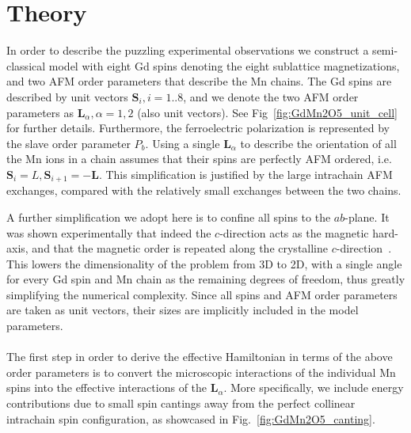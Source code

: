 \section{Theory \label{sec:GdMn2O5_Theory}}
In order to describe the puzzling experimental observations we construct a semi-classical model with eight Gd spins denoting the eight sublattice magnetizations, and two AFM order parameters that describe the Mn chains.
The Gd spins are described by unit vectors $\bm{S}_i, i=1..8$, and we denote the two AFM order parameters as $\bm{L}_\alpha, \alpha=1,2$ (also unit vectors). See Fig~\ref{fig:GdMn2O5_unit_cell} for further details.
Furthermore, the ferroelectric polarization is represented by the slave order parameter $P_b$.
Using a single $\bm{L}_\alpha$ to describe the orientation of all the Mn ions in a chain assumes that their spins are perfectly AFM ordered, i.e. $\bm{S}_i = L, \bm{S}_{i+1} = - \bm{L}$.
This simplification is justified by the large intrachain AFM exchanges, compared with the relatively small exchanges between the two chains.

A further simplification we adopt here is to confine all spins to the $ab$-plane.
It was shown experimentally that indeed the $c$-direction acts as the magnetic hard-axis, and that the magnetic order is repeated along the crystalline $c$-direction~\cite{Lee13}.
This lowers the dimensionality of the problem from 3D to 2D, with a single angle for every Gd spin and Mn chain as the remaining degrees of freedom, thus greatly simplifying the numerical complexity.
Since all spins and AFM order parameters are taken as unit vectors, their sizes are implicitly included in the model parameters.
\\\\
The first step in order to derive the effective Hamiltonian in terms of the above order parameters is to convert the microscopic interactions of the individual Mn spins into the effective interactions of the $\bm{L}_\alpha$.
More specifically, we include energy contributions due to small spin cantings away from the perfect collinear intrachain spin configuration, as showcased in Fig.~\ref{fig:GdMn2O5_canting}.

\begin{figure*}[h]
    \centering
	\caption{{\bf Energy contributions due to spin canting.} a) The Zeeman contribution due to the weak ferromagnetic moment along the field (H, red arrow), as a result of the spin canting. b) The contribution due to Heisenberg exchange when previously parallel Mn spins are canted towards a more AFM alignment. This is a direct result of the geometric frustration. The collinear configuration is denoted by the black arrows, with the dashed teal arrows showing the orientation due to the slight canting by the angle $\delta \theta$. \label{fig:GdMn2O5_canting}}
\end{figure*}


